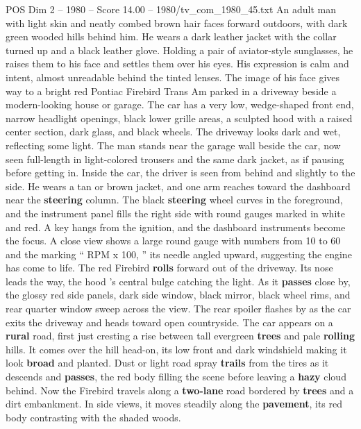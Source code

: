 \begin{textsample}{POS Dim 2 – 1980 – Score 14.00 – 1980/tv\_com\_1980\_45.txt}  \label{ex:f2_pos_069}
An adult man with light skin and neatly combed brown hair faces forward outdoors, with dark green wooded hills behind him.
He wears a dark leather jacket with the collar turned up and a black leather glove.
Holding a pair of aviator-style sunglasses, he raises them to his face and settles them over his eyes.
His expression is calm and intent, almost unreadable behind the tinted lenses.
The image of his face gives way to a bright red Pontiac Firebird Trans Am parked in a driveway beside a modern-looking house or garage.
The car has a very low, wedge-shaped front end, narrow headlight openings, black lower grille areas, a sculpted hood with a raised center section, dark glass, and black wheels.
The driveway looks dark and wet, reflecting some light.
The man stands near the garage wall beside the car, now seen full-length in light-colored trousers and the same dark jacket, as if pausing before getting in.
Inside the car, the driver is seen from behind and slightly to the side.
He wears a tan or brown jacket, and one arm reaches toward the dashboard near the \textbf{steering} column.
The black \textbf{steering} wheel curves in the foreground, and the instrument panel fills the right side with round gauges marked in white and red.
A key hangs from the ignition, and the dashboard instruments become the focus.
A close view shows a large round gauge with numbers from 10 to 60 and the marking “ RPM x 100, ” its needle angled upward, suggesting the engine has come to life.
The red Firebird \textbf{rolls} forward out of the driveway.
Its nose leads the way, the hood ’s central bulge catching the light.
As it \textbf{passes} close by, the glossy red side panels, dark side window, black mirror, black wheel rims, and rear quarter window sweep across the view.
The rear spoiler flashes by as the car exits the driveway and heads toward open countryside.
The car appears on a \textbf{rural} road, first just cresting a rise between tall evergreen \textbf{trees} and pale \textbf{rolling} hills.
It comes over the hill head-on, its low front and dark windshield making it look \textbf{broad} and planted.
Dust or light road spray \textbf{trails} from the tires as it descends and \textbf{passes}, the red body filling the scene before leaving a \textbf{hazy} cloud behind.
Now the Firebird travels along a \textbf{two-lane} road bordered by \textbf{trees} and a dirt embankment.
In side views, it moves steadily along the \textbf{pavement}, its red body contrasting with the shaded woods.

\end{textsample}
